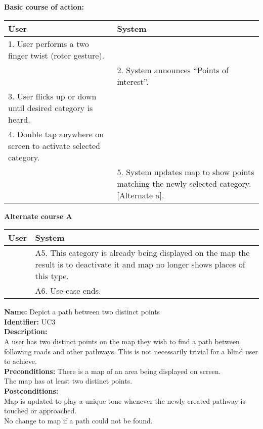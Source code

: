 \documentclass[11pt,twoside,a4paper]{article}
\begin{document}
\textbf{Basic course of action:}\\
\begin{tabularx}{\textwidth}{ |X|X| }
  \textbf{User} & \textbf{System}\\
  \hline
  1. User performs a two finger twist (roter gesture). & \\
  \hline
  & 2. System announces ``Points of interest''.\\
  \hline
  3. User flicks up or down until desired category is heard. & \\
  \hline
  4. Double tap anywhere on screen to activate selected
  category. & \\
  \hline
  & 5. System updates map to show points matching the newly selected
  category. [Alternate a].\\
  \hline
\end{tabularx}

\textbf{Alternate course A}\\
\begin{tabularx}{\textwidth}{ |X|X| }
  \textbf{User} & \textbf{System}\\
  \hline
  & A5. This category is already being displayed on the map the result
  is to deactivate it and map no longer shows places of this type.\\
  \hline
  & A6. Use case ends.\\
  \hline
\end{tabularx}

\textbf{Name:} Depict a path between two distinct points\\
\textbf{Identifier:} UC3\\
\textbf{Description:}\\
A user has two distinct points on the map they wish to find a path
between following roads and other pathways. This is not necessarily
trivial for a blind user to achieve.\\
\textbf{Preconditions:}
There is a map of an area being displayed on screen.\\
The map has at least two distinct points.\\
\textbf{Postconditions:}\\
Map is updated to play a unique tone whenever the newly created pathway
is touched or approached.\\
No change to map if a path could not be found.
\end{document}
